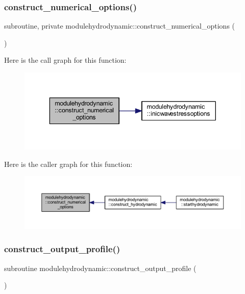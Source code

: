 \subsubsection{\texorpdfstring{construct\+\_\+numerical\+\_\+options()}{construct\_numerical\_options()}}
{\footnotesize\ttfamily subroutine, private modulehydrodynamic\+::construct\+\_\+numerical\+\_\+options (\begin{DoxyParamCaption}{ }\end{DoxyParamCaption})\hspace{0.3cm}{\ttfamily [private]}}

Here is the call graph for this function\+:\nopagebreak
\begin{figure}[H]
\begin{center}
\leavevmode
\includegraphics[width=343pt]{namespacemodulehydrodynamic_aec1826f2eaf93245fac759d36238b464_cgraph}
\end{center}
\end{figure}
Here is the caller graph for this function\+:\nopagebreak
\begin{figure}[H]
\begin{center}
\leavevmode
\includegraphics[width=350pt]{namespacemodulehydrodynamic_aec1826f2eaf93245fac759d36238b464_icgraph}
\end{center}
\end{figure}
\mbox{\label{namespacemodulehydrodynamic_aa3b8aa943159cc40b65537cff1888b6e}} 
\subsubsection{\texorpdfstring{construct\+\_\+output\+\_\+profile()}{construct\_output\_profile()}}
{\footnotesize\ttfamily subroutine modulehydrodynamic\+::construct\+\_\+output\+\_\+profile (\begin{DoxyParamCaption}{ }\end{DoxyParamCaption})\hspace{0.3cm}{\ttfamily [private]}}

